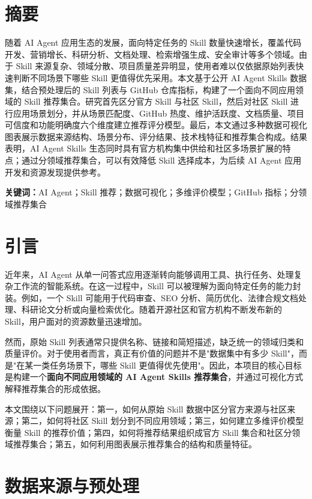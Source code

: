 \documentclass[UTF8,a4paper,12pt]{ctexart}
\begin{document}
\section*{摘要}
随着 AI Agent 应用生态的发展，面向特定任务的 Skill 数量快速增长，覆盖代码开发、营销增长、科研分析、文档处理、检索增强生成、安全审计等多个领域。由于 Skill 来源复杂、领域分散、项目质量差异明显，使用者难以仅依据原始列表快速判断不同场景下哪些 Skill 更值得优先采用。本文基于公开 AI Agent Skills 数据集，结合预处理后的 Skill 列表与 GitHub 仓库指标，构建了一个面向不同应用领域的 Skill 推荐集合。研究首先区分官方 Skill 与社区 Skill，然后对社区 Skill 进行应用场景划分，并从场景匹配度、GitHub 热度、维护活跃度、文档质量、项目可信度和功能明确度六个维度建立推荐评分模型。最后，本文通过多种数据可视化图表展示数据来源结构、场景分布、评分结果、技术栈特征和推荐集合构成。结果表明，AI Agent Skills 生态同时具有官方机构集中供给和社区多场景扩展的特点；通过分领域推荐集合，可以有效降低 Skill 选择成本，为后续 AI Agent 应用开发和资源发现提供参考。

\noindent\textbf{关键词：}AI Agent；Skill 推荐；数据可视化；多维评价模型；GitHub 指标；分领域推荐集合

\newpage

\section{引言}

近年来，AI Agent 从单一问答式应用逐渐转向能够调用工具、执行任务、处理复杂工作流的智能系统。在这一过程中，Skill 可以被理解为面向特定任务的能力封装。例如，一个 Skill 可能用于代码审查、SEO 分析、简历优化、法律合规文档处理、科研论文分析或向量检索优化。随着开源社区和官方机构不断发布新的 Skill，用户面对的资源数量迅速增加。

然而，原始 Skill 列表通常只提供名称、链接和简短描述，缺乏统一的领域归类和质量评价。对于使用者而言，真正有价值的问题并不是"数据集中有多少 Skill"，而是"在某一类任务场景下，哪些 Skill 更值得优先使用"。因此，本项目的核心目标是构建一个\textbf{面向不同应用领域的 AI Agent Skills 推荐集合}，并通过可视化方式解释推荐集合的形成依据。

本文围绕以下问题展开：第一，如何从原始 Skill 数据中区分官方来源与社区来源；第二，如何将社区 Skill 划分到不同应用领域；第三，如何建立多维评价模型衡量 Skill 的推荐价值；第四，如何将推荐结果组织成官方 Skill 集合和社区分领域推荐集合；第五，如何利用图表展示推荐集合的结构和质量特征。

\section{数据来源与预处理}
\end{document}
